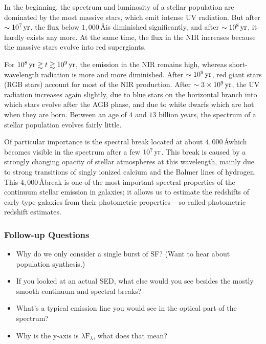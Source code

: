 \documentclass[a4paper,11pt]{article}
\begin{document}
{\noindent}In the beginning, the spectrum and luminosity of a stellar population are dominated by the most massive stars, which emit intense UV radiation. But after $\sim10^7\,{\rm yr}$, the flux below $1,000$\,\AA is diminished significantly, and after $\sim10^8\,{\rm yr}$, it hardly exists any more. At the same time, the flux in the NIR increases because the massive stars evolve into red supergiants.

{\noindent}For $10^8\,{\rm yr}\gtrsim t\gtrsim10^9\,{\rm yr}$, the emission in the NIR remains high, whereas short-wavelength radiation is more and more diminished. After $\sim10^9\,{\rm yr}$, red giant stars (RGB stars) account for most of the NIR production. After $\sim3\times10^9\,{\rm yr}$, the UV radiation increases again slightly, due to blue stars on the horizontal branch into which stars evolve after the AGB phase, and due to white dwarfs which are hot when they are born. Between an age of $4$ and $13$ billion years, the spectrum of a stellar population evolves fairly little. 

{\noindent}Of particular importance is the spectral break located at about $4,000$\,\AA which becomes visible in the spectrum after a few $10^7\,{\rm yr}$. This break is caused by a strongly changing opacity of stellar atmospheres at this wavelength, mainly due to strong transitions of singly ionized calcium and the Balmer lines of hydrogen. This $4,000$\,\AA break is one of the most important spectral properties of the continuum stellar emission in galaxies; it allows us to estimate the redshifts of early-type galaxies from their photometric properties -- so-called photometric redshift estimates.

\subsubsection{Follow-up Questions}

\begin{itemize}
    \item Why do we only consider a single burst of SF? (Want to hear about population synthesis.)
    \item If you looked at an actual SED, what else would you see besides the mostly smooth continuum and spectral breaks?
    \item What's a typical emission line you would see in the optical part of the spectrum?
    \item Why is the y-axis is $\lambda\mathrm{F}_\lambda$, what does that mean?
\end{itemize}
\end{document}
